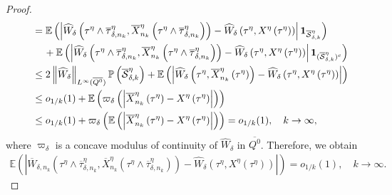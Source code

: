 \documentclass[amscd,amssymb,11pt]{article}
\numberwithin{theorem}{section}
\numberwithin{equation}{section}
\begin{document}
\begin{proof}
\begin{align*}
&\quad =\mathbb{E}\left(\left|\widehat{W}_{\delta}\left(\tau^{\eta}\wedge\overline{\tau}_{\delta,n_{k}}^{\eta},\overline{X}_{n_{k}}^{\eta}\left(\tau^{\eta}\wedge\overline{\tau}_{\delta,n_{k}}^{\eta}\right)\right)-\widehat{W}_{\delta}\left(\tau^{\eta},X^{\eta}\left(\tau^{\eta}\right)\right)\right|{\bf 1}_{\overline{\mathcal{S}}_{\delta,k}^{\eta}}\right)\\
&\qquad\,+\mathbb{E}\left(\left|\widehat{W}_{\delta}\left(\tau^{\eta}\wedge\overline{\tau}_{\delta,n_{k}}^{\eta},\overline{X}_{n_{k}}^{\eta}\left(\tau^{\eta}\wedge\overline{\tau}_{\delta,n_{k}}^{\eta}\right)\right)-\widehat{W}_{\delta}\left(\tau^{\eta},X^{\eta}\left(\tau^{\eta}\right)\right)\right|{\bf 1}_{(\overline{\mathcal{S}}_{\delta,k}^{\eta})^{c}}\right)\\
&\quad\leq 2\left\|\widehat{W}_{\delta}\right\|_{L^{\infty}(\overline{Q^{0}})}\mathbb{P}\left(\overline{\mathcal{S}}_{\delta,k}^{\eta}\right)+\mathbb{E}\left(\left|\widehat{W}_{\delta}\left(\tau^{\eta},\overline{X}_{n_{k}}^{\eta}\left(\tau^{\eta}\right)\right)-\widehat{W}_{\delta}\left(\tau^{\eta},X^{\eta}\left(\tau^{\eta}\right)\right)\right|\right)\\
&\quad\leq o_{1/k}(1)+\mathbb{E}\left(\varpi_{\delta}\left(\left|\overline{X}_{n_{k}}^{\eta}\left(\tau^{\eta}\right)-X^{\eta}\left(\tau^{\eta}\right)\right|\right)\right)\\
&\quad\leq o_{1/k}(1)+\varpi_{\delta}\left(\mathbb{E}\left(\left|\overline{X}_{n_{k}}^{\eta}\left(\tau^{\eta}\right)-X^{\eta}\left(\tau^{\eta}\right)\right|\right)\right)=o_{1/k}(1),\quad k\rightarrow\infty,
\end{align*}
where $\varpi_{\delta}$ is a concave modulus of continuity of $\widehat{W}_{\delta}$ in $\overline{Q^{0}}$. Therefore, we obtain
\begin{align}\label{eq:EstDiffOverlineWdeltakWdelta}
\mathbb{E}\left(\left|\overline{W}_{\delta,n_{k}}\left(\tau^{\eta}\wedge\overline{\tau}_{\delta,n_{k}}^{\eta},\overline{X}_{n_{k}}^{\eta}\left(\tau^{\eta}\wedge\overline{\tau}_{\delta,n_{k}}^{\eta}\right)\right)-\widehat{W}_{\delta}\left(\tau^{\eta},X^{\eta}\left(\tau^{\eta}\right)\right)\right|\right)=o_{1/k}(1),\quad k\rightarrow\infty.
\end{align}


\end{proof}
\end{document}
